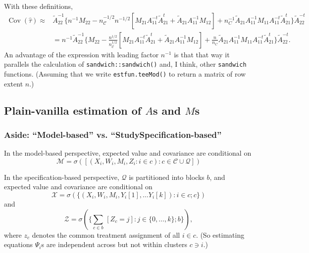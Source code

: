 \documentclass{article}
\begin{document}
With these definitions,
\begin{align}
  \operatorname{Cov}(\hat\tau) \approx& \tilde{A}_{22}^{-1}\{n^{-1} M_{22} -
                                 n_{\mathcal{C}}^{-1/2}n^{-1/2}[M_{21}A_{11}^{-t}\tilde{A}_{21}^t
                                 + \tilde{A}_{21}A_{11}^{-1}M_{12}] +
                                 n_C^{-1}\tilde{A}_{21}A_{11}^{-1}M_{11}A_{11}^{-t}\tilde{A}_{21}^{t}\}\tilde{A}_{22}^{-t}\nonumber
  \\
                               &= n^{-1}\tilde{A}_{22}^{-1}\{
                                 M_{22} -
                                 \frac{n^{1/2}}{n_{\mathcal{C}}^{1/2}}[M_{21}A_{11}^{-t}\tilde{A}_{21}^t
                                 + \tilde{A}_{21}A_{11}^{-1}M_{12}] +
                                 \frac{n}{n_C}\tilde{A}_{21}A_{11}^{-1}M_{11}A_{11}^{-t}\tilde{A}_{21}^{t}\}\tilde{A}_{22}^{-t}
                                . \label{eq:6}
\end{align}
An advantage of the expression with leading factor $n^{-1}$ is that
that way it parallels the calculation of
\texttt{sandwich::sandwich()} and, I think, other \texttt{sandwich}
functions. (Assuming that we write
\texttt{estfun.teeMod()}  to return a matrix of row extent
$n$.)

  \subsection{Plain-vanilla estimation of $A$s and $M$s}
\subsubsection {Aside: ``Model-based'' vs. ``StudySpecification-based''}\label{sec:spec-vs-mod-based}

In the model-based perspective, expected value and covariance are
conditional on
\[ \mathcal{M} = \sigma\left(\left[(X_{i}, W_{i}, M_{i}, Z_{i}: i \in c): c \in
      \mathcal{C}\cup \mathcal{Q} \right]\right)\]


In the specification-based perspective, $\mathcal{Q}$ is partitioned into
blocks $b$, and expected value and covariance are
conditional on
\[\mathcal{X} = \sigma(\{(X_{i}, W_{i}, M_{i}, Y_{i}[1], \ldots Y_{i}[k]):
  i \in c; c\})\]
and
\[\mathcal{Z} = \sigma(\{\sum_{c \in b}\, \![Z_{c}=j\!] : j \in \{0, \ldots, k\}; b\} ),\]
where $z_{c}$ denotes the common treatment assignment of all $i\in
c$. (So estimating equations ${\Psi}_{i}$s are independent across but not within
clusters $c \ni i$.)
\end{document}
